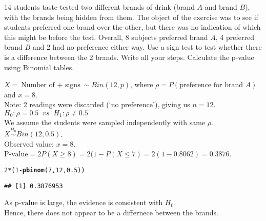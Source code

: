 \documentclass[bigtut]{tutorial}\usepackage[]{graphicx}\usepackage[]{color}
\makeatletter
\newcommand{\hlnum}[1]{\textcolor[rgb]{0.686,0.059,0.569}{#1}}%
\newcommand{\hlopt}[1]{\textcolor[rgb]{0,0,0}{#1}}%
\newcommand{\hlstd}[1]{\textcolor[rgb]{0.345,0.345,0.345}{#1}}%
\newcommand{\hlkwd}[1]{\textcolor[rgb]{0.737,0.353,0.396}{\textbf{#1}}}%
\newenvironment{kframe}{%
 \def\at@end@of@kframe{}%
 \ifinner\ifhmode%
  \def\at@end@of@kframe{\end{minipage}}%
  \begin{minipage}{\columnwidth}%
 \fi\fi%
 \def\FrameCommand##1{\hskip\@totalleftmargin \hskip-\fboxsep
 \colorbox{shadecolor}{##1}\hskip-\fboxsep
     \hskip-\linewidth \hskip-\@totalleftmargin \hskip\columnwidth}%
 \MakeFramed {\advance\hsize-\width
   \@totalleftmargin\z@ \linewidth\hsize
   \@setminipage}}%
 {\par\unskip\endMakeFramed%
 \at@end@of@kframe}
\newenvironment{knitrout}{}{} %
\makeatother
\begin{document}
\begin{tutorial}
\begin{questions}
14 students taste-tested two different brands of drink
(brand $A$ and brand $B$), with the brands being hidden from them. The
object of the exercise was to see if students preferred one brand
over the other, but there was no indication of which this might be
before the test. Overall, 8 subjects preferred brand $A$, 4 preferred
brand $B$ and 2 had no preference either way. Use a sign test to test whether there is a difference between the 2 brands.
Write all your steps. Calculate the p-value using Binomial tables.


\begin{solution}
$X = \text{Number of $+$ signs} \sim Bin(12, p)$, where $\rho = P(\text{preference for brand }A)$ and $x=8$. \\
Note: 2 readings were discarded (`no preference'), giving us $n=12$. \\

$H_0: \rho=0.5  \;\; vs \;\; H_1: \rho \neq 0.5$ \\

 We assume the students were sampled independently with same $\rho$. \\

$X \overset{H_0}{\sim} Bin(12,0.5)$.\\
Observed value: $x=8$. \\

$\text{P-value} = 2 P(X \geq 8) = 2(1- P(X \leq 7) 
= 2(1- 0.8062) = 0.3876$. \\

\begin{knitrout}
\color{fgcolor}\begin{kframe}
\begin{alltt}
\hlnum{2}\hlopt{*}\hlstd{(}\hlnum{1}\hlopt{-}\hlkwd{pbinom}\hlstd{(}\hlnum{7}\hlstd{,}\hlnum{12}\hlstd{,}\hlnum{0.5}\hlstd{))}
\end{alltt}
\begin{verbatim}
## [1] 0.3876953
\end{verbatim}
\end{kframe}
\end{knitrout}

 As $\text{p-value}$ is large, the evidence is consistent with $H_{0}$. \\
Hence, there does not appear to be a differnece between the brands. \\
\end{solution}











\end{questions}
\end{tutorial}
\end{document}
